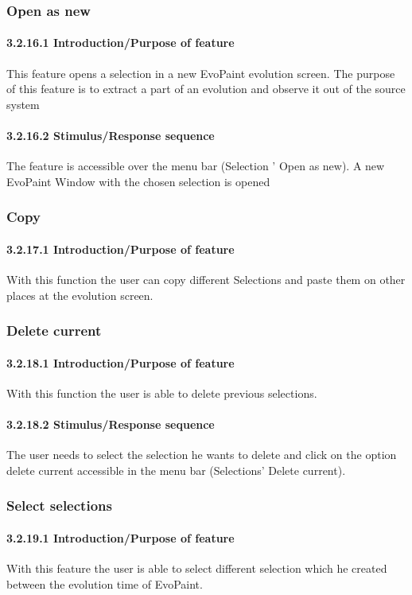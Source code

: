 \documentclass[titlepage,12pt]{scrartcl}
\begin{document}
\subsubsection{Open as new}
\paragraph{3.2.16.1	Introduction/Purpose of feature}
This feature opens a selection in a new EvoPaint evolution screen. The purpose of this feature is to extract a part of an evolution and observe it out of the source system
\paragraph{3.2.16.2	Stimulus/Response sequence}
The feature is accessible over the menu bar (Selection ' Open as new). A new EvoPaint Window with the chosen selection is opened

\subsubsection{Copy}
\paragraph{3.2.17.1	Introduction/Purpose of feature}
With this function the user can copy different Selections and paste them on other places at the evolution screen.

\subsubsection{Delete current}
\paragraph{3.2.18.1	Introduction/Purpose of feature}
With this function the user is able to delete previous selections. 
\paragraph{3.2.18.2	Stimulus/Response sequence}
The user needs to select the selection he wants to delete and click on the option delete current accessible in the menu bar (Selections' Delete current).

\subsubsection{Select selections}
\paragraph{3.2.19.1	Introduction/Purpose of feature}
With this feature the user is able to select different selection which he created between the evolution time of EvoPaint.
\end{document}
